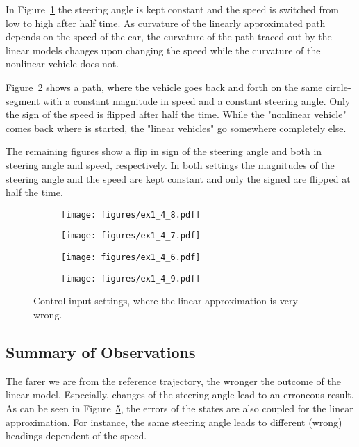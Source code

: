 In Figure~\ref{fig:ex8} the steering angle is kept constant and the speed is switched from low to high after half time. 
As curvature of the linearly approximated path depends on the speed of the car, the curvature of the path traced out by the linear models changes upon changing the speed while the curvature of the nonlinear vehicle does not.

Figure~\ref{fig:ex7} shows a path, where the vehicle goes back and forth on the same circle-segment with a constant magnitude in speed and a constant steering angle.
Only the sign of the speed is flipped after half the time.
While the "nonlinear vehicle" comes back where is started, the "linear vehicles" go somewhere completely else.

The remaining figures show a flip in sign of the steering angle and both in steering angle and speed, respectively.
In both settings the magnitudes of the steering angle and the speed are kept constant and only the signed are flipped at half the time.

\begin{figure}[h]
	\centering
	\begin{subfigure}{0.49\textwidth}
		\texttt{[image: figures/ex1\_4\_8.pdf]}
		\label{fig:ex8}
	\end{subfigure}
	\begin{subfigure}{0.49\textwidth}
		\texttt{[image: figures/ex1\_4\_7.pdf]}
		\label{fig:ex7}
	\end{subfigure}
	\begin{subfigure}{0.49\textwidth}
		\texttt{[image: figures/ex1\_4\_6.pdf]}
		\label{fig:ex6}
	\end{subfigure}
	\begin{subfigure}{0.49\textwidth}
		\texttt{[image: figures/ex1\_4\_9.pdf]}
		\label{fig:ex9}
	\end{subfigure}
	\caption{Control input settings, where the linear approximation is very wrong.}
	\label{fig:ex6789}
\end{figure}

\subsection{Summary of Observations}
The farer we are from the reference trajectory, the wronger the outcome of the linear model. 
Especially, changes of the steering angle lead to an erroneous result.
As can be seen in Figure~\ref{fig:ex6789}, the errors of the states are also coupled for the linear approximation.
For instance, the same steering angle leads to different (wrong) headings dependent of the speed.
